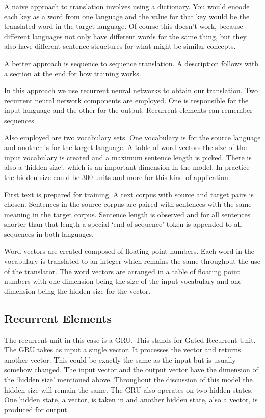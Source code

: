 A naive approach to translation involves using a dictionary. You would encode each key as a word from one language and the value for that key would be the translated word in the target language. Of course this doesn't work, because different languages not only have different words for the same thing, but they also have different sentence structures for what might be similar concepts.

A better approach is sequence to sequence translation. A description follows with a section at the end for how training works.

In this approach we use recurrent neural networks to obtain our translation. Two recurrent neural network components are employed. One is responsible for the input language and the other for the output. Recurrent elements can remember sequences. 

Also employed are two vocabulary sets. One vocabulary is for the source language and another is for the target language. A table of word vectors the size of the input vocabulary is created and a maximum sentence length is picked. There is also a `hidden size', which is an important dimension in the model. In practice the hidden size could be 300 units and more for this kind of application.

First text is prepared for training. A text corpus with source and target pairs is chosen. Sentences in the source corpus are paired with sentences with the same meaning in the target corpus. Sentence length is observed and for all sentences shorter than that length a special `end-of-sequence' token is appended to all sequences in both languages.

Word vectors are created composed of floating point numbers. Each word in the vocabulary is translated to an integer which remains the same throughout the use of the translator. The word vectors are arranged in a table of floating point numbers with one dimension being the size of the input vocabulary and one dimension being the hidden size for the vector.

\subsection*{Recurrent Elements}
The recurrent unit in this case is a GRU. This stands for Gated Recurrent Unit. The GRU takes as input a single vector. It processes the vector and returns another vector. This could be
exactly the same as the input but is usually somehow changed. The input vector and the output vector have the
dimension of the `hidden size' mentioned above. Throughout the discussion of this model the hidden size will remain the same. The GRU also operates on two hidden states. One hidden state, a vector, is taken in and another hidden state, also a vector, is produced for output.

